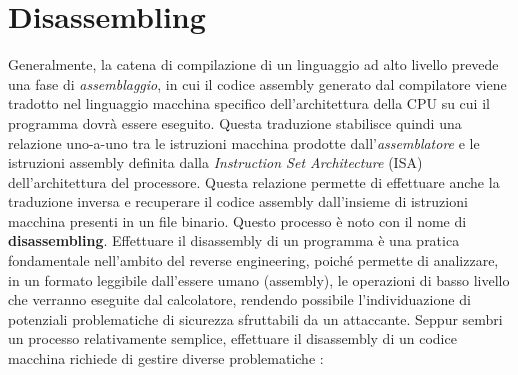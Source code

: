 \documentclass[../main.tex]{subfiles}
\begin{document}
\section{Disassembling}
Generalmente, la catena di compilazione di un linguaggio ad alto livello prevede una fase di \textit{assemblaggio}, in cui il codice assembly generato dal compilatore viene tradotto
nel linguaggio macchina specifico dell'architettura della CPU su cui il programma dovrà essere eseguito. Questa traduzione stabilisce quindi una relazione uno-a-uno tra le istruzioni macchina
prodotte dall'\textit{assemblatore} e le istruzioni assembly definita dalla \textit{Instruction Set Architecture} (ISA) dell'architettura del processore.
Questa relazione permette di effettuare anche la traduzione inversa e recuperare il codice assembly dall'insieme di istruzioni macchina presenti in un file binario.
Questo processo è noto con il nome di \textbf{disassembling}. Effettuare il disassembly di un programma è una pratica fondamentale nell'ambito del reverse engineering, poiché permette di analizzare, in un formato leggibile dall'essere umano (assembly), le operazioni
di basso livello che verranno eseguite dal calcolatore, rendendo possibile l'individuazione di potenziali problematiche di sicurezza sfruttabili da un attaccante.
Seppur sembri un processo relativamente semplice, effettuare il disassembly di un codice macchina richiede di gestire diverse problematiche \cite{Disassembly2}:
\end{document}
